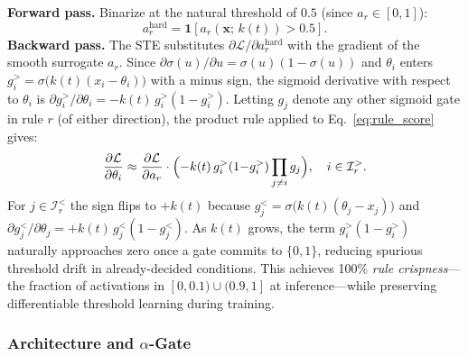 \documentclass[journal]{IEEEtran}
\begin{document}
\noindent\textbf{Forward pass.} Binarize at the natural threshold of $0.5$
(since $a_r\in[0,1]$):
\begin{equation}
  a_r^{\mathrm{hard}} = \mathbf{1}[a_r(\mathbf{x};\,k(t)) > 0.5].
  \label{eq:ste_fwd}
\end{equation}
\noindent\textbf{Backward pass.} The STE substitutes
$\partial\mathcal{L}/\partial a_r^{\mathrm{hard}}$ with the gradient of
the smooth surrogate $a_r$. Since
$\partial\sigma(u)/\partial u = \sigma(u)(1{-}\sigma(u))$ and $\theta_i$
enters $g_i^{>}{=}\sigma\!\bigl(k(t)(x_i{-}\theta_i)\bigr)$ with a minus
sign, the sigmoid derivative with respect to $\theta_i$ is
$\partial g_i^{>}/\partial\theta_i = -k(t)\,g_i^{>}(1{-}g_i^{>})$.
Letting $g_j$ denote any other sigmoid gate in rule $r$ (of either
direction), the product rule applied to Eq.~\ref{eq:rule_score} gives:
\begin{equation}
  \frac{\partial \mathcal{L}}{\partial \theta_i} \approx
    \frac{\partial \mathcal{L}}{\partial a_r} \cdot
    \Bigl(-k(t)\,g_i^{>}(1{-}g_i^{>})\prod_{j \neq i} g_j\Bigr),
    \quad i\in\mathcal{I}_r^{>}.
  \label{eq:ste_bwd}
\end{equation}
For $j\in\mathcal{I}_r^{<}$ the sign flips to $+k(t)$ because
$g_j^{<}{=}\sigma\!\bigl(k(t)(\theta_j{-}x_j)\bigr)$ and
$\partial g_j^{<}/\partial\theta_j{=}+k(t)\,g_j^{<}(1{-}g_j^{<})$.
As $k(t)$ grows, the term $g_i^{>}(1{-}g_i^{>})$ naturally approaches
zero once a gate commits to $\{0,1\}$, reducing spurious threshold
drift in already-decided conditions. This achieves 100\% \emph{rule
crispness}---the fraction of activations in $[0,0.1)\cup(0.9,1]$ at
inference---while preserving differentiable threshold learning during
training.

\subsubsection{Architecture and \texorpdfstring{$\alpha$}{alpha}-Gate}
\end{document}
